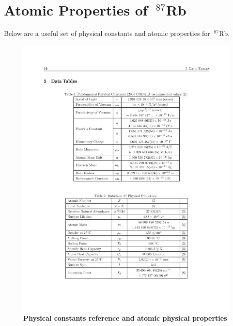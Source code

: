 
%


\chapter{Atomic Properties of $~^{87}$Rb}
\label{App:AtomProp}

Below are a useful set of physical constants and atomic properties for $~^{87}$Rb. \cite{SteckRb}

\newpage

\begin{figure}[ht!]
		\includegraphics[width=\columnwidth]{figures/ap1/SteckTable12.pdf} 
		\caption{\textbf{Physical constants reference and atomic physical properties}\cite{SteckRb} }
		\label{fig:SteckT12}	
\end{figure}

